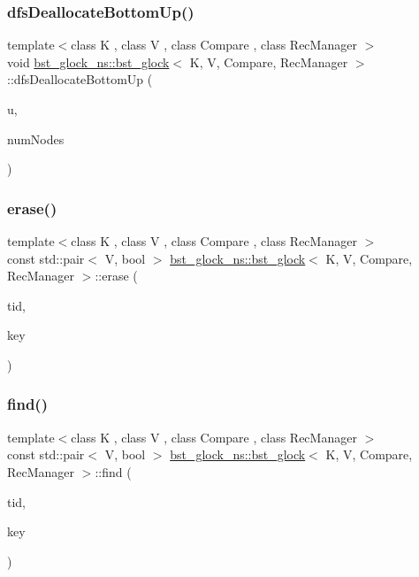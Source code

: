 \subsubsection{\texorpdfstring{dfs\+Deallocate\+Bottom\+Up()}{dfsDeallocateBottomUp()}}
{\footnotesize\ttfamily template$<$class K , class V , class Compare , class Rec\+Manager $>$ \\
void \hyperlink{classbst__glock__ns_1_1bst__glock}{bst\+\_\+glock\+\_\+ns\+::bst\+\_\+glock}$<$ K, V, Compare, Rec\+Manager $>$\+::dfs\+Deallocate\+Bottom\+Up (\begin{DoxyParamCaption}\item[{\hyperlink{bst__rwlock__impl_8h_a04158d2a20768fe447133ff555823b05}{nodeptr} const}]{u,  }\item[{int $\ast$}]{num\+Nodes }\end{DoxyParamCaption})\hspace{0.3cm}{\ttfamily [inline]}}

\mbox{\label{classbst__glock__ns_1_1bst__glock_a1f5c007ceb36ceb008cf131c4abc4759}} 
\subsubsection{\texorpdfstring{erase()}{erase()}}
{\footnotesize\ttfamily template$<$class K , class V , class Compare , class Rec\+Manager $>$ \\
const std\+::pair$<$ V, bool $>$ \hyperlink{classbst__glock__ns_1_1bst__glock}{bst\+\_\+glock\+\_\+ns\+::bst\+\_\+glock}$<$ K, V, Compare, Rec\+Manager $>$\+::erase (\begin{DoxyParamCaption}\item[{const int}]{tid,  }\item[{const K \&}]{key }\end{DoxyParamCaption})}

\mbox{\label{classbst__glock__ns_1_1bst__glock_a76d33315a4ed9843194d7e893f8eb09b}} 
\subsubsection{\texorpdfstring{find()}{find()}}
{\footnotesize\ttfamily template$<$class K , class V , class Compare , class Rec\+Manager $>$ \\
const std\+::pair$<$ V, bool $>$ \hyperlink{classbst__glock__ns_1_1bst__glock}{bst\+\_\+glock\+\_\+ns\+::bst\+\_\+glock}$<$ K, V, Compare, Rec\+Manager $>$\+::find (\begin{DoxyParamCaption}\item[{const int}]{tid,  }\item[{const K \&}]{key }\end{DoxyParamCaption})}


